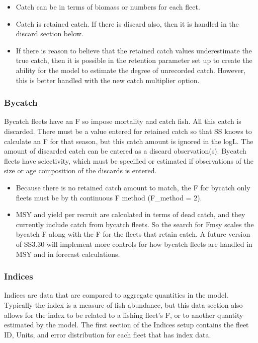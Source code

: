 \begin{itemize}
	\item Catch can be in terms of biomass or numbers for each fleet.
	\item Catch is retained catch. If there is discard also, then it is handled in the discard section below.
	\item If there is reason to believe that the retained catch values underestimate the true catch, then it is possible in the retention parameter set up to create the ability for the model to estimate the degree of unrecorded catch.  However, this is better handled with the new catch multiplier option.
\end{itemize}
\subsubsection{Bycatch}
Bycatch fleets have an F so impose mortality and catch fish.  All this catch is discarded.  There must be a value entered for retained catch so that SS knows to calculate an F for that season, but this catch amount is ignored in the logL.  The amount of discarded catch can be entered as a discard observation(s).  Bycatch fleets have selectivity, which must be specified or estimated if observations of the size or age composition of the discards is entered.
\begin{itemize}
	\item Because there is no retained catch amount to match, the F for bycatch only fleets must be by th continuous F method  (F\_method = 2).
	\item  MSY and yield per recruit are calculated in terms of dead catch, and they currently include catch from bycatch fleets.  So the search for Fmsy scales the bycatch F along with the F for the fleets that retain catch.  A future version of SS3.30 will implement more controls for how bycatch fleets are handled in MSY and in forecast calculations. 
\end{itemize}

\subsubsection{Indices}
Indices are data that are compared to aggregate quantities in the model.  Typically the index is a measure of fish abundance, but this data section also allows for the index to be related to a fishing fleet's F, or to another quantity estimated by the model.  The first section of the Indices setup contains the fleet ID, Units, and error distribution for each fleet that has index data.

